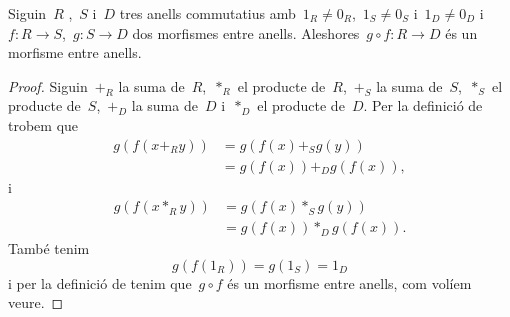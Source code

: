 \documentclass[../../main.tex]{subfiles}
\begin{document}
    \begin{proposition}
        \label{prop:operació morfismes entre anells és morfisme entre anells}
        Siguin~\(R\) ,~\(S\) i~\(D\) tres anells commutatius amb~\(1_{R}\neq0_{R}\),~\(1_{S}\neq0_{S}\) i~\(1_{D}\neq0_{D}\) i~\(f\colon R\longrightarrow S\),~\(g\colon S\longrightarrow D\) dos morfismes entre anells.
        Aleshores~\(g\circ f\colon R\longrightarrow D\) és un morfisme entre anells.
        \begin{proof}
            Siguin~\(+_{R}\) la suma de~\(R\),~\(\ast_{R}\) el producte de~\(R\),~\(+_{S}\) la suma de~\(S\),~\(\ast_{S}\) el producte de~\(S\),~\(+_{D}\) la suma de~\(D\) i~\(\ast_{D}\) el producte de~\(D\).
            Per la definició de  trobem que
            \begin{align*}
            g(f(x+_{R}y))&=g(f(x)+_{S}g(y))\\
            &=g(f(x))+_{D}g(f(x)),
            \end{align*}
            i
            \begin{align*}
            g(f(x\ast_{R}y))&=g(f(x)\ast_{S}g(y))\\
            &=g(f(x))\ast_{D}g(f(x)).
            \end{align*}
            També tenim
            \[
                g(f(1_{R}))=g(1_{S})=1_{D}
            \]
            i per la definició de  tenim que~\(g\circ f\) és un morfisme entre anells, com volíem veure.
        \end{proof}
    \end{proposition}
\end{document}
